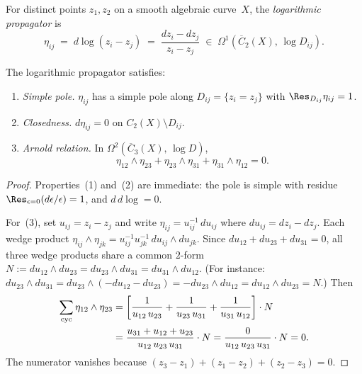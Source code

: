 \begin{definition}\label{def:fourier-log-propagator}
For distinct points $z_1, z_2$ on a smooth algebraic curve~$X$, the
\emph{logarithmic propagator} is
\begin{equation}\label{eq:fourier-log-propagator}
\eta_{ij} \;=\; d\log(z_i - z_j)
\;=\; \frac{dz_i - dz_j}{z_i - z_j}
\;\in\; \Omega^1(\overline{C}_2(X),\, \log D_{ij}).
\end{equation}
\end{definition}

\begin{proposition}
\label{prop:fourier-propagator-properties}
The logarithmic propagator satisfies:
\begin{enumerate}
\item \emph{Simple pole.}
 $\eta_{ij}$ has a simple pole along
 $D_{ij} = \{z_i = z_j\}$ with
 $\Res_{D_{ij}}\eta_{ij} = 1$.
\item \emph{Closedness.}
 $d\eta_{ij} = 0$ on $C_2(X) \setminus D_{ij}$.
\item \emph{Arnold relation.}
 In $\Omega^2(\overline{C}_3(X),\, \log D)$,
 \begin{equation}\label{eq:fourier-arnold}
 \eta_{12} \wedge \eta_{23}
 + \eta_{23} \wedge \eta_{31}
 + \eta_{31} \wedge \eta_{12} = 0.
 \end{equation}
\end{enumerate}
\end{proposition}

\begin{proof}
Properties~(1) and~(2) are immediate: the pole is simple with
residue $\Res_{\epsilon=0}(d\epsilon/\epsilon) = 1$, and
$d\,d\!\log = 0$.

For~(3), set $u_{ij} = z_i - z_j$ and write
$\eta_{ij} = u_{ij}^{-1}\,du_{ij}$ where
$du_{ij} = dz_i - dz_j$.
Each wedge product
$\eta_{ij} \wedge \eta_{jk}
 = u_{ij}^{-1} u_{jk}^{-1}\, du_{ij} \wedge du_{jk}$.
Since $du_{12} + du_{23} + du_{31} = 0$, all three wedge products
share a common $2$-form
$N := du_{12} \wedge du_{23}
= du_{23} \wedge du_{31} = du_{31} \wedge du_{12}$.
(For instance:
$du_{23} \wedge du_{31}
= du_{23} \wedge (-du_{12} - du_{23})
= -du_{23} \wedge du_{12} = du_{12} \wedge du_{23} = N$.)
Then
\begin{align}
\sum_{\mathrm{cyc}} \eta_{12} \wedge \eta_{23}
&= \left[
 \frac{1}{u_{12}\,u_{23}}
 + \frac{1}{u_{23}\,u_{31}}
 + \frac{1}{u_{31}\,u_{12}}
\right] \cdot N
\notag \\
&= \frac{u_{31} + u_{12} + u_{23}}{u_{12}\,u_{23}\,u_{31}}
 \cdot N
= \frac{0}{u_{12}\,u_{23}\,u_{31}} \cdot N = 0.
\label{eq:fourier-arnold-computation}
\end{align}
The numerator vanishes because
$(z_3 - z_1) + (z_1 - z_2) + (z_2 - z_3) = 0$.
\end{proof}

